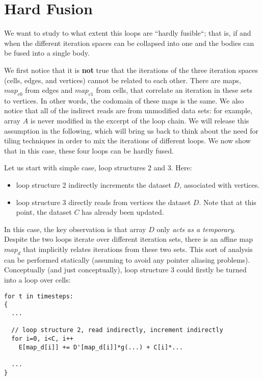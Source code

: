 \documentclass[a4paper]{article}
\begin{document}
\section{Hard Fusion}
We want to study to what extent this loops are ``hardly fusible``; that is, if and when the different iteration spaces can be collapsed into one and the bodies can be fused into a single body.

We first notice that it is \textbf{not} true that the iterations of the three iteration spaces (cells, edges, and vertices) cannot be related to each other. There are maps, $map_{c0}$ from edges and $map_{c1}$ from cells, that correlate an iteration in these sets to vertices. In other words, the codomain of these maps is the same. We also notice that all of the indirect reads are from unmodified data sets: for example, array $A$ is never modified in the excerpt of the loop chain. We will release this assumption in the following, which will bring us back to think about the need for tiling techniques in order to mix the iterations of different loops. We now show that in this case, these four loops can be hardly fused.

Let us start with simple case, loop structures 2 and 3. Here:
\begin{itemize}
\item loop structure 2 indirectly increments the dataset $D$, associated with vertices.
\item loop structure 3 directly reads from vertices the dataset $D$. Note that at this point, the dataset $C$ has already been updated.
\end{itemize}
In this case, the key observation is that array $D$ only \textit{acts as a temporary}. Despite the two loops iterate over different iteration sets, there is an affine map $map_{d}$ that implicitly relates iterations from these two sets. This sort of analysis can be performed statically (assuming to avoid any pointer aliasing problems). Conceptually (and just conceptually), loop structure 3 could firstly be turned into a loop over cells:

\begin{footnotesize}
\begin{lstlisting}
for t in timesteps:
{
  ...
          
  // loop structure 2, read indirectly, increment indirectly
  for i=0, i<C, i++
    E[map_d[i]] += D'[map_d[i]]*g(...) + C[i]*...

  ...
}
\end{lstlisting}
\end{footnotesize}
\end{document}
